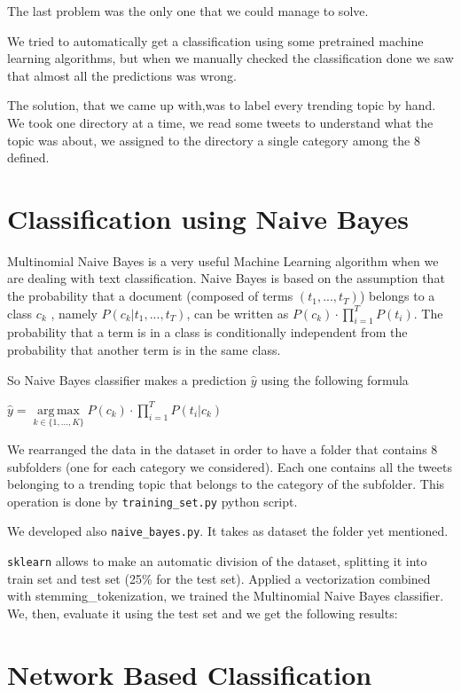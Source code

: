 \documentclass[journal,11pt]{vgtc}
\DeclareMathOperator*{\argmax}{arg\,max}
\begin{document}
The last problem was the only one that we could manage to solve. 

We tried to automatically get a classification using some pretrained machine learning algorithms, but when we 
manually checked the classification done we saw that almost all the predictions was wrong.

The solution, that we came up with,was to label every trending topic by hand. 
We took one directory at a time, we read some tweets to understand what the topic was about, 
we assigned to the directory a single category among the 8 defined.



\section{Classification using Naive Bayes}
Multinomial Naive Bayes is a very useful Machine Learning algorithm when we are dealing with
text classification. 
Naive Bayes is based on the assumption that the probability that a document (composed of terms $(t_1,...,t_T)$) belongs to a class $c_k$
, namely $P(c_k | t_1, ..., t_T) $, can be written as $P(c_k) \cdot \prod\limits_{i=1}^{T}P(t_i)$.
The probability that a term is in a class is conditionally independent from the probability that 
 another term is in the same class.

 So Naive Bayes classifier makes a prediction $\hat{y}$ using the following formula

\begin{center}
$\hat{y} = \argmax\limits_{k \in \{1, ..., K \}} P(c_k) \cdot \prod\limits_{i = 1}^{T} P(t_i | c_k)$
\end{center}

We rearranged the data in the dataset in order to have a folder that contains 8 subfolders (one for each
category we considered). Each one contains all the tweets belonging to a trending topic that belongs to the category of the subfolder.
This operation is done by \texttt{training\_set.py} python script.

We developed also \texttt{naive\_bayes.py}. It takes as dataset the folder yet mentioned.

\texttt{sklearn} allows to make an automatic division of the dataset, splitting it into train set and
test set (25\% for the test set).
Applied a vectorization combined with stemming\_tokenization, we trained the Multinomial Naive Bayes classifier.
We, then, evaluate it using the test set and we get the following results:


\section{Network Based Classification}



\end{document}
